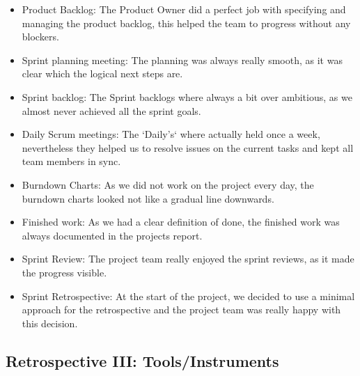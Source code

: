 \begin{itemize}
    \item Product Backlog: The Product Owner did a perfect job with specifying and managing the product backlog, this helped the team to progress without any blockers.
    \item Sprint planning meeting: The planning was always really smooth, as it was clear which the logical next steps are.
    \item Sprint backlog: The Sprint backlogs where always a bit over ambitious, as we almost never achieved all the sprint goals.
    \item Daily Scrum meetings: The `Daily's` where actually held once a week, nevertheless they helped us to resolve issues on the current tasks and kept all team members in sync.
    \item Burndown Charts: As we did not work on the project every day, the burndown charts looked not like a gradual line downwards.
    \item Finished work: As we had a clear definition of done, the finished work was always documented in the projects report.
    \item Sprint Review: The project team really enjoyed the sprint reviews, as it made the progress visible.
    \item Sprint Retrospective: At the start of the project, we decided to use a minimal approach for the retrospective and the project team was really happy with this decision.
\end{itemize}

\subsection{Retrospective III: Tools/Instruments}\label{subsec:retrospective-tools-instruments}

